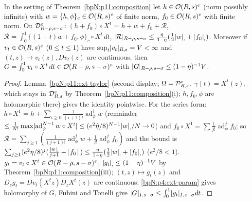 \begin{proposition}\label{bpN:p11:transform}
In the setting of Theorem~\ref{bpN:p11:composition} let $h\in\mathcal O(R,s)^e$ (norm possibly infinite) with $w=\{h,\phi\}_c\in\mathcal O(R,s)^e$ of finite norm, $f_0\in\mathcal O(R,s)^e$ with finite norm. On $\mathcal D_{R-\rho,s-\sigma}^e$: $(h+f_0)\circ X^1=h+w+f_0+\mathcal R$, $\mathcal R=\int_0^1\{(1-t)w+f_0,\phi\}_c\circ X^t\,dt$, $\lvert \mathcal R\rvert_{R-\rho,s-\sigma}\le\frac\eta{1-\eta}(\frac12\lvert w\rvert_{,}+\lvert f_0\rvert_{,})$. Moreover if $v_t\in\mathcal O(R,s)^e$ ($0\le t\le1$) have $\sup_t\lvert v_t\rvert_{R,s}=V<\infty$ and $(t,z)\mapsto v_t(z),Dv_t(z)$ are continuous, then $G=\int_0^1v_t\circ X^t\,dt\in\mathcal O(R-\rho,s-\sigma)^e$ with $\lvert G\rvert_{R-\rho,s-\sigma}\le(1-\eta)^{-1}V$.
\end{proposition}
\begin{proof}
\label{stepN:p11:tr-taylor} Lemma~\ref{bpN:p11:ext-taylor} (second display; $\Omega=\mathcal D_{R,s}^e$, $\gamma(t)=X^t(z)$, which stays in $\mathcal D_{R,s}^e$ by Theorem~\ref{bpN:p11:composition}(i); $h,f_0,\phi$ are holomorphic there) gives the identity pointwise. For the series form: $h\circ X^1=h+\sum_{i\ge0}\frac1{(i+1)!}\operatorname{ad}^i_\phi w$ (remainder $\le\frac1{N!}\max\lvert \operatorname{ad}^{N-1}_\phi w\circ X^t\rvert\le(e^2\hat\eta/8)^{N-1}\lvert w\rvert_{,}/N\to0$) and $f_0\circ X^1=\sum\frac1{j!}\operatorname{ad}^j_\phi f_0$; so $\mathcal R=\sum_{j\ge1}(\frac1{(j+1)!}\operatorname{ad}^j_\phi w+\frac1{j!}\operatorname{ad}^j_\phi f_0)$ and the bound is $\sum_{j\ge1}(e^2\eta/8)^j(\frac{\lvert w\rvert_{,}}{j+1}+\lvert f_0\rvert_{,})\le\frac\eta{1-\eta}(\frac12\lvert w\rvert_{,}+\lvert f_0\rvert_{,})$ ($e^2/8<1$).
\label{stepN:p11:tr-int} $g_t=v_t\circ X^t\in\mathcal O(R-\rho,s-\sigma)^e$, $\lvert g_t\rvert_{,}\le(1-\eta)^{-1}V$ by Theorem~\ref{bpN:p11:composition}(iii); $(t,z)\mapsto g_t(z)$ and $D_zg_t=Dv_t(X^tz)D_zX^t(z)$ are continuous; \ref{bpN:p4:ext-param} gives holomorphy of $G$, Fubini and Tonelli give $\lvert G\rvert_{I,s-\sigma}\le\int_0^1\lvert g_t\rvert_{I,s-\sigma}dt$.
\end{proof}


